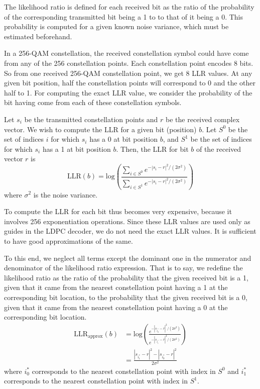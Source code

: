 The likelihood ratio is defined for each received bit as the ratio of the
probability of the corresponding transmitted bit being a 1 to to that of it
being a 0. This probability is computed for a given known noise variance, which
must be estimated beforehand.

In a 256-QAM constellation, the received constellation symbol could have come
from any of the 256 constellation points. Each constellation point encodes 8
bits. So from one received 256-QAM constellation point, we get 8 LLR values. At
any given bit position, half the constellation points will correspond to 0 and
the other half to 1. For computing the exact LLR value, we consider the
probability of the bit having come from each of these constellation symbols.

Let $s_i$ be the transmitted constellation points and $r$ be the received
complex vector. We wish to compute the LLR for a given bit (position) $b$. Let
$S^0$ be the set of indices $i$ for which $s_i$ has a 0 at bit position $b$,
and $S^1$ be the set of indices for which $s_i$ has a 1 at bit position $b$.
Then, the LLR for bit $b$ of the received vector $r$ is
\begin{equation}
	\text{LLR}(b) = \text{log} \left (
		\frac{ \sum_{i \in S^0}{e^{- |s_i - r|^2 / (2 \sigma^2)}} }
		     { \sum_{i \in S^1}{e^{- |s_i - r|^2 / (2 \sigma^2)}} }
		\right )
\end{equation}
where $\sigma^2$ is the noise variance.

To compute the LLR for each bit thus becomes very expensive, because it
involves 256 exponentiation operations. Since these LLR values are used only as
guides in the LDPC decoder, we do not need the exact LLR values. It is
sufficient to have good approximations of the same.

To this end, we neglect all terms except the dominant one in the numerator and
denominator of the likelihood ratio expression. That is to say, we redefine the
likelihood ratio as the ratio of the probability that the given received bit is
a 1, given that it came from the nearest constellation point having a 1 at the
corresponding bit location, to the probability that the given received bit is a
0, given that it came from the nearest constellation point having a 0 at the
corresponding bit location.
\begin{align}
	\text{LLR}_{\text{approx}}(b) &= \text{log} \left (
		\frac{ e^{- |s_{i^*_0} - r|^2 / (2 \sigma^2)} }
		     { e^{- |s_{i^*_1} - r|^2 / (2 \sigma^2)} }
		\right ) \\
		&= \frac{|s_{i^*_1} - r|^2 - |s_{i^*_0} - r|^2}{2 \sigma^2}
\end{align}
where $i^*_0$ corresponds to the nearest constellation point with index in
$S^0$ and $i^*_1$ corresponds to the nearest constellation point with index in
$S^1$.

